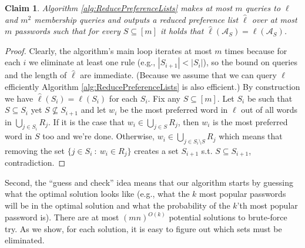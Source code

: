 \documentclass[prodmode,acmec]{ec-acmsmall}
\newtheorem{claim}[theorem]{Claim}
\begin{document}
\begin{claim} \label{claim:ReducedPreferenceListClaim} Algorithm \ref{alg:ReducePreferenceLists} makes at most $m$ queries to $\ell$ and $m^2$ membership queries and outputs a reduced preference list $\hat{\ell}$ over at most $m$ passwords such that for every $S \subseteq [m]$ it holds that $\hat{\ell}\left(\mathcal{A}_S\right) = \ell\left(\mathcal{A}_S\right)$. 
\end{claim}
\begin{proof}
Clearly, the algorithm's main loop iterates at most $m$ times because for each $i$ we eliminate at least one rule (e.g., $\left|S_{i+1}\right| < \left|S_i\right|$), so the bound on queries and the length of $\hat\ell$ are immediate. (Because we assume that we can query $\ell$ efficiently Algorithm \ref{alg:ReducePreferenceLists} is also efficient.) By construction we have $\hat{\ell}(S_i) = \ell(S_i)$ for each $S_i$. Fix any $S \subseteq [m]$. Let $S_i$ be such that $S \subseteq S_i$ yet $S \not\subseteq S_{i+1}$ and let $w_i$ be the most preferred word in $\ell$ out of all words in $\bigcup_{j\in S_i}R_j$. If it is the case that $w_i \in \bigcup_{j\in S} R_j$, then $w_i$ is the most preferred word in $S$ too and we're done. Otherwise, $w_i \in \bigcup_{j\in S_i \setminus S} R_j$ which means that removing the set $\{j \in S_i ~:~ w_i \in R_j\}$ creates a set $S_{i+1}$ s.t. $S\subseteq S_{i+1}$, contradiction.
\end{proof}

Second, the ``guess and check'' idea means that our algorithm starts by guessing what the optimal solution looks like (e.g., what the $k$ most popular passwords will be in the optimal solution and what the probability of the $k$'th most popular password is). There are at most $\left(mn\right)^{O(k)}$ potential solutions to brute-force try. As we show, for each solution, it is easy to figure out which sets must be eliminated.
\end{document}
